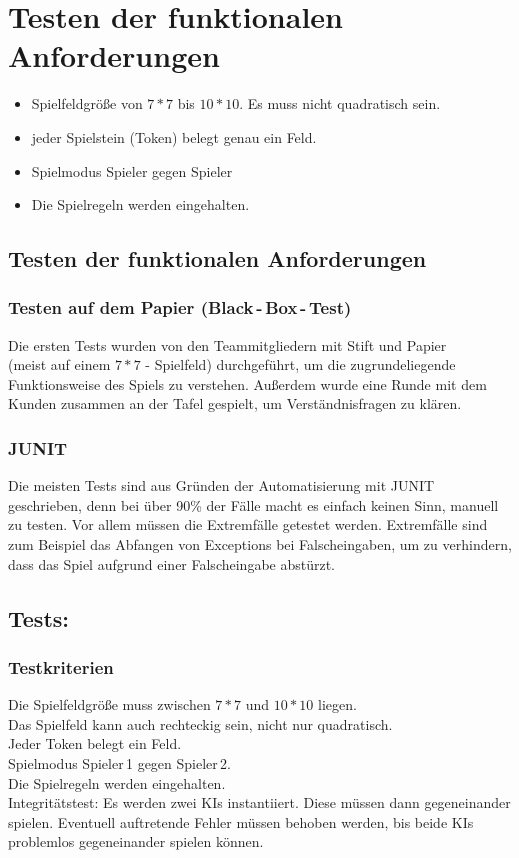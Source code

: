 \documentclass[a4paper, 12pt]{article}
\begin{document}
	\section{Testen der funktionalen Anforderungen}
	\begin{itemize}
		\item Spielfeldgröße von $7*7$ bis $10*10$. Es muss nicht quadratisch sein.
		\item jeder Spielstein (Token) belegt genau ein Feld.
		\item Spielmodus Spieler gegen Spieler
		\item Die Spielregeln werden eingehalten.
	\end{itemize}
	
	\pagebreak
	
	\subsection{Testen der funktionalen Anforderungen}
	\subsubsection{Testen auf dem Papier (Black\,-\,Box\,-\,Test)}
	Die ersten Tests wurden von den Teammitgliedern mit Stift und Papier \\
	(meist auf einem $7*7$ - Spielfeld) durchgeführt, um die zugrundeliegende Funktionsweise	
	des Spiels zu verstehen. Außerdem wurde eine Runde mit dem Kunden zusammen an der Tafel gespielt, 
	um Verständnisfragen zu klären.
	
	\subsubsection{JUNIT}
	Die meisten Tests sind aus Gründen der Automatisierung mit JUNIT geschrieben, denn bei über 90\% der Fälle
	macht es einfach keinen Sinn, manuell zu testen.\newline
	Vor allem müssen die Extremfälle getestet werden. Extremfälle sind zum Beispiel das Abfangen von 
	Exceptions bei Falscheingaben, um zu verhindern, dass das Spiel aufgrund einer Falscheingabe abstürzt. 
	
	\subsection{Tests: }
	\subsubsection{Testkriterien}
	Die Spielfeldgröße muss zwischen $7*7$ und $10*10$ liegen.\\
	Das Spielfeld kann auch rechteckig sein, nicht nur quadratisch.\\
	Jeder Token belegt ein Feld.\\
	Spielmodus Spieler\,1 gegen Spieler\,2.\\
	Die Spielregeln werden eingehalten.\\
	Integritätstest: Es werden zwei KIs instantiiert. Diese müssen dann gegeneinander
	spielen. Eventuell auftretende Fehler müssen behoben werden, bis beide KIs 
	problemlos gegeneinander spielen können.
	
\end{document}
